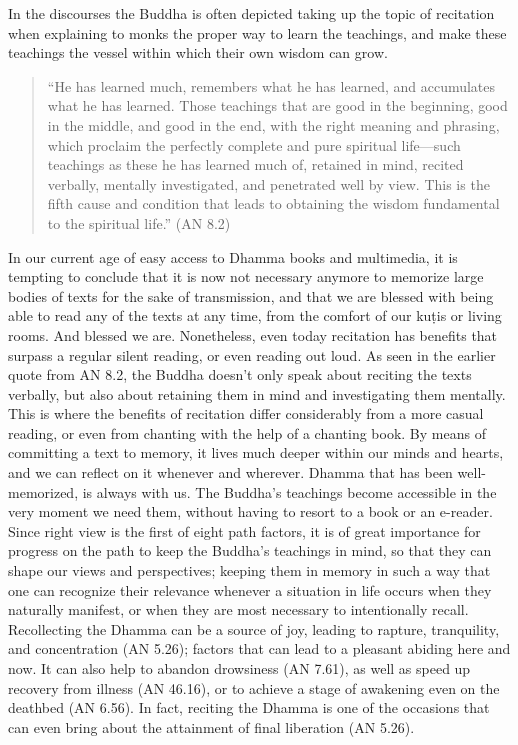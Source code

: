 In the discourses the Buddha is often depicted taking up the topic of recitation when explaining to monks the proper way to learn the teachings, and make these teachings the vessel within which their own wisdom can grow.\\

\begin{quote}
  “He has learned much, remembers what he has learned, and accumulates what he has learned. Those teachings that are good in the beginning, good in the middle, and good in the end, with the right meaning and phrasing, which proclaim the perfectly complete and pure spiritual life—such teachings as these he has learned much of, retained in mind, recited verbally, mentally investigated, and penetrated well by view. This is the fifth cause and condition that leads to obtaining the wisdom fundamental to the spiritual life.” (AN 8.2)\\
\end{quote}


In our current age of easy access to Dhamma books and multimedia, it is tempting to conclude that it is now not necessary anymore to memorize large bodies of texts for the sake of transmission, and that we are blessed with being able to read any of the texts at any time, from the comfort of our kuṭis or living rooms. And blessed we are. Nonetheless, even today recitation has benefits that surpass a regular silent reading, or even reading out loud. As seen in the earlier quote from AN 8.2, the Buddha doesn’t only speak about reciting the texts verbally, but also about retaining them in mind and investigating them mentally. This is where the benefits of recitation differ considerably from a more casual reading, or even from chanting with the help of a chanting book. By means of committing a text to memory, it lives much deeper within our minds and hearts, and we can reflect on it whenever and wherever. Dhamma that has been well-memorized, is always with us. The Buddha’s teachings become accessible in the very moment we need them, without having to resort to a book or an e-reader.\\

Since right view is the first of eight path factors, it is of great importance for progress on the path to keep the Buddha’s teachings in mind, so that they can shape our views and perspectives; keeping them in memory in such a way that one can recognize their relevance whenever a situation in life occurs when they naturally manifest, or when they are most necessary to intentionally recall. Recollecting the Dhamma can be a source of joy, leading to rapture, tranquility, and concentration (AN 5.26); factors that can lead to a pleasant abiding here and now. It can also help to abandon drowsiness (AN 7.61), as well as speed up recovery from illness (AN 46.16), or to achieve a stage of awakening even on the deathbed (AN 6.56). In fact, reciting the Dhamma is one of the occasions that can even bring about the attainment of final liberation (AN 5.26).\\

